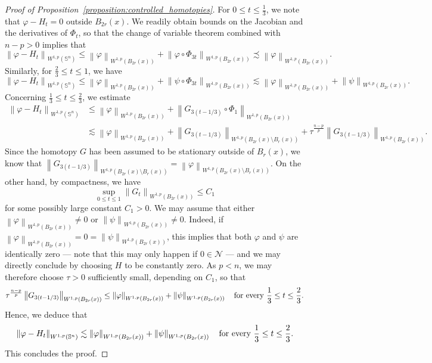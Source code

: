 \documentclass[12pt]{amsart}
\def\n{{\mathcal N}}
\def\n{{\mathcal{M}}}
\def\n{{\mathcal N}}
\def\S{{\mathbb S}}
\newcommand{\brac}[1]{\left (#1 \right )}
\newcommand{\norm}[1]{\left\|{#1}\right\|}
\numberwithin{theorem}{section} \numberwithin{equation}{section}
\newcommand{\aleq}{\precsim}
\begin{document}
\begin{proof}[Proof of Proposition~\ref{proposition:controlled_homotopies}]
	For $ 0 \leq t \leq \frac{1}{3} $, we note that $\varphi - H_t =0$ outside $B_{2r}(x)$. We readily obtain bounds on the Jacobian and the derivatives of $ \Phi_{t} $, so that the change of variable theorem combined with $n-p>0$ implies that
	\[
			\norm{\varphi - H_{t}}_{W^{1,p}(\S^n)}
		\leq
		\norm{\varphi}_{W^{1,p}(B_{2r}(x))} + \norm{\varphi \circ \Phi_{3t}}_{W^{1,p}(B_{2r}(x))}
		\aleq \norm{\varphi}_{W^{1,p}(B_{2r}(x))}\text{.}
	\]
	Similarly, for $ \frac{2}{3} \leq t \leq 1 $, we have
	\[
		\norm{\varphi - H_{t}}_{W^{1,p}(\S^n)}
		\leq
		\norm{\varphi}_{W^{1,p}(B_{2r}(x))} + \norm{\psi \circ \Phi_{3t}}_{W^{1,p}(B_{2r}(x))}
		\lesssim
		\norm{\varphi}_{W^{1,p}(B_{2r}(x))} + \norm{\psi}_{W^{1,p}(B_{2r}(x))}\text{.}
	\]
	Concerning $ \frac{1}{3} \leq t \leq \frac{2}{3} $, we estimate
	\[
	\begin{split}
		\norm{\varphi - H_{t}}_{W^{1,p}(\S^n)}
		&\leq
 		\norm{\varphi}_{W^{1,p}(B_{2r}(x))} + \norm{G_{3\brac{t-1/3}} \circ \Phi_{1}}_{W^{1,p}(B_{2r}(x))}\\
 		&\lesssim
  		\norm{\varphi}_{W^{1,p}(B_{2r}(x))} + \norm{G_{3\brac{t-1/3}}}_{W^{1,p}(B_{2r}(x) \setminus B_r(x)) } + \tau^{\frac{n-p}{p}}\norm{G_{3\brac{t-1/3}}}_{W^{1,p}(B_{2r}(x))}\text{.}
	\end{split}
	\]
	Since the homotopy $ G $ has been assumed to be stationary outside of $ B_r(x)  $, we know that $ \norm{G_{3\brac{t-1/3}}}_{W^{1,p}(B_{2r}(x) \setminus B_r(x))} = \norm{\varphi}_{W^{1,p}(B_{2r}(x)\setminus B_r(x) )} $.
	On the other hand, by compactness, we have
	\[
		\sup_{0 \leq t \leq 1} \norm{G_{t}}_{W^{1,p}(B_{2r}(x))}
		\leq
		C_1
	\]
	for some possibly large constant $ C_1 > 0 $.
	We may assume that either \( \norm{\varphi}_{W^{1,p}(B_{2r}(x))} \neq 0 \) or \( \norm{\psi}_{W^{1,p}(B_{2r}(x))} \neq 0 \).
	Indeed, if \( \norm{\varphi}_{W^{1,p}(B_{2r}(x))} = 0 = \norm{\psi}_{W^{1,p}(B_{2r}(x))} \), this implies that both \( \varphi \) and \( \psi \) are identically zero --- note that this may only happen if \( 0 \in \n \) --- and we may directly conclude by choosing \( H \) to be constantly zero.
	As $ p < n $, we may therefore choose $ \tau > 0 $ sufficiently small, depending on $ C_1 $, so that
	\[
		\tau^{\frac{n-p}{p}}\norm{G_{3\brac{t-1/3}}}_{W^{1,p}(B_{2r}(x))}
		\leq
		\norm{\varphi}_{W^{1,p}(B_{2r}(x))} + \norm{\psi}_{W^{1,p}(B_{2r}(x))}
		\quad
		\text{for every $ \frac{1}{3} \leq t \leq \frac{2}{3} $.}
	\]
	Hence, we deduce that
	\[
		\norm{\varphi - H_{t}}_{W^{1,p}(\S^n)}
		\lesssim
		\norm{\varphi}_{W^{1,p}(B_{2r}(x))} + \norm{\psi}_{W^{1,p}(B_{2r}(x))}
		\quad
		\text{for every $ \frac{1}{3} \leq t \leq \frac{2}{3} $.}
	\]
	This concludes the proof.
\end{proof}
\end{document}
